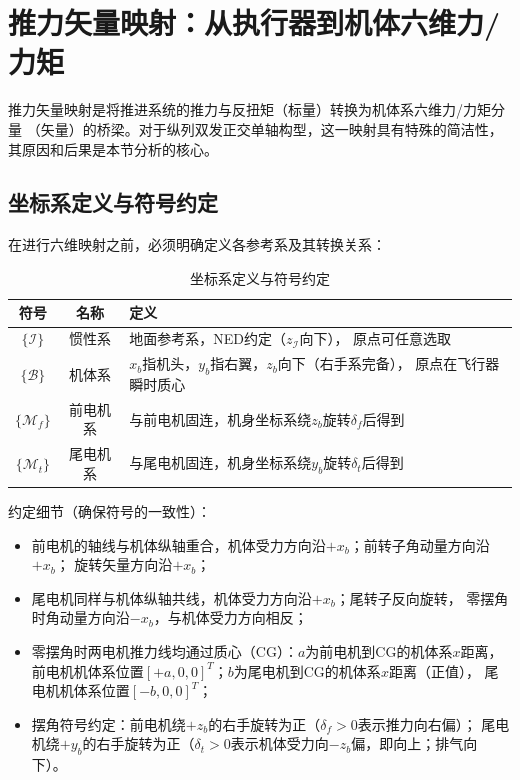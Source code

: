 \section{推力矢量映射：从执行器到机体六维力/力矩}
\label{sec:mapping}

推力矢量映射是将推进系统的推力与反扭矩（标量）转换为机体系六维力/力矩分量
（矢量）的桥梁。对于纵列双发正交单轴构型，这一映射具有特殊的简洁性，
其原因和后果是本节分析的核心。

\subsection{坐标系定义与符号约定}

在进行六维映射之前，必须明确定义各参考系及其转换关系：

\begin{table}[H]
\centering
\caption{坐标系定义与符号约定}
\begin{tabularx}{\textwidth}{c c >{\raggedright\arraybackslash}X}
\toprule
符号 & 名称 & 定义 \\
\midrule
$\{\mathcal{I}\}$ & 惯性系 & 地面参考系，NED约定（$z_{\mathcal{I}}$向下），
                      原点可任意选取 \\
$\{\mathcal{B}\}$ & 机体系 & $x_b$指机头，$y_b$指右翼，$z_b$向下（右手系完备），
                      原点在飞行器瞬时质心 \\
$\{\mathcal{M}_f\}$ & 前电机系 & 与前电机固连，机身坐标系绕$z_b$旋转$\delta_f$后得到 \\
$\{\mathcal{M}_t\}$ & 尾电机系 & 与尾电机固连，机身坐标系绕$y_b$旋转$\delta_t$后得到 \\
\bottomrule
\end{tabularx}
\end{table}

约定细节（确保符号的一致性）：
\begin{itemize}
    \item 前电机的轴线与机体纵轴重合，机体受力方向沿$+x_b$；前转子角动量方向沿$+x_b$；
          旋转矢量方向沿$+x_b$；
    \item 尾电机同样与机体纵轴共线，机体受力方向沿$+x_b$；尾转子反向旋转，
          零摆角时角动量方向沿$-x_b$，与机体受力方向相反；
    \item 零摆角时两电机推力线均通过质心（CG）：$a$为前电机到CG的机体系$x$距离，
          前电机机体系位置$[+a, 0, 0]^T$；$b$为尾电机到CG的机体系$x$距离（正值），
          尾电机机体系位置$[-b, 0, 0]^T$；
    \item 摆角符号约定：前电机绕$+z_b$的右手旋转为正（$\delta_f > 0$表示推力向右偏）；
          尾电机绕$+y_b$的右手旋转为正（$\delta_t > 0$表示机体受力向$-z_b$偏，即向上；排气向下）。
\end{itemize}

